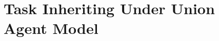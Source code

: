 \documentclass[journal]{IEEEtran}
\begin{document}
\section{Task Inheriting Under Union Agent Model}
\end{document}
